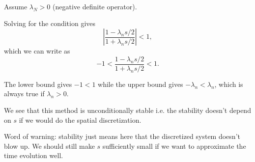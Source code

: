 \begin{frame}
	Assume $ \lambda_N > 0 $ (negative definite operator). 
	
	\pause
	Solving for the condition gives
	\[ \left|
	\frac{1 - \lambda_n s/2 }{1 + \lambda_n s/2}
	\right| < 1, \]
	which we can write as 
	\[ -1 < \frac{1 - \lambda_n s/2 }{1 + \lambda_n s/2} < 1. \]
	
	\pause
	The lower bound gives $ -1 < 1 $ while the upper bound gives $ -\lambda_n < \lambda_n $, which is always true if $ \lambda_n > 0 $. 
	
	\pause
	We see that this method is \alert{unconditionally stable} i.e. the stability doesn't depend on $ s $ if we would do the spatial discretization.
	
	\pause
	\alert{Word of warning:} stability just means here that the discretized system doesn't blow up. We should still make $ s $ sufficiently small if we want to approximate the time evolution well. 
	
\end{frame}


